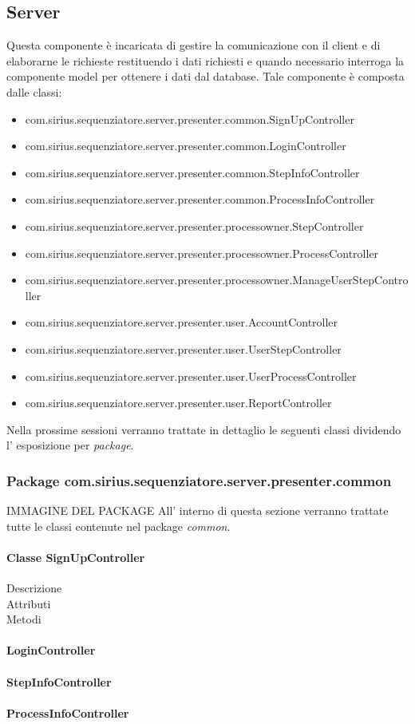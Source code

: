 \subsection{Server}
Questa componente è incaricata di gestire la comunicazione con il client e di elaborarne le richieste restituendo i dati richiesti e quando necessario interroga la componente model per ottenere i dati dal database.
Tale componente è composta dalle classi:
\begin{itemize}
	\item com.sirius.sequenziatore.server.presenter.common.SignUpController
	\item com.sirius.sequenziatore.server.presenter.common.LoginController
	\item com.sirius.sequenziatore.server.presenter.common.StepInfoController
	\item com.sirius.sequenziatore.server.presenter.common.ProcessInfoController
	\item com.sirius.sequenziatore.server.presenter.processowner.StepController
	\item com.sirius.sequenziatore.server.presenter.processowner.ProcessController
	\item com.sirius.sequenziatore.server.presenter.processowner.ManageUserStepController
	\item com.sirius.sequenziatore.server.presenter.user.AccountController
	\item com.sirius.sequenziatore.server.presenter.user.UserStepController
	\item com.sirius.sequenziatore.server.presenter.user.UserProcessController
	\item com.sirius.sequenziatore.server.presenter.user.ReportController
\end{itemize}
Nella prossime sessioni verranno trattate in dettaglio le seguenti classi dividendo l' esposizione per \textit{package}.
\subsubsection{Package com.sirius.sequenziatore.server.presenter.common}
IMMAGINE DEL PACKAGE
All' interno di questa sezione verranno trattate tutte le classi contenute nel package \textit{common}.
\paragraph{Classe SignUpController}
\begin{description}
	\item[Descrizione]
	\item[Attributi]
	\item[Metodi]
\end{description}
\paragraph{LoginController}

\paragraph{StepInfoController}

\paragraph{ProcessInfoController}